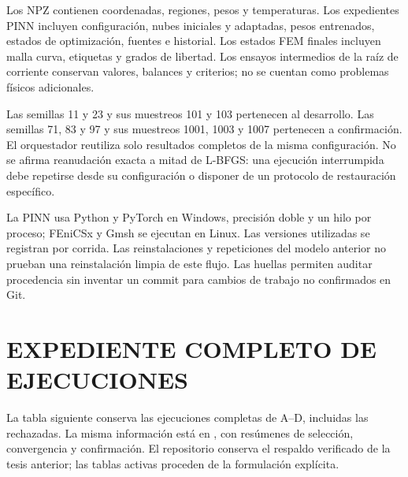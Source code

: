 Los NPZ contienen coordenadas, regiones, pesos y temperaturas. Los expedientes PINN incluyen configuración, nubes iniciales y adaptadas, pesos entrenados, estados de optimización, fuentes e historial. Los estados FEM finales incluyen malla curva, etiquetas y grados de libertad. Los ensayos intermedios de la raíz de corriente conservan valores, balances y criterios; no se cuentan como problemas físicos adicionales.

Las semillas 11 y 23 y sus muestreos 101 y 103 pertenecen al desarrollo. Las semillas 71, 83 y 97 y sus muestreos 1001, 1003 y 1007 pertenecen a confirmación. El orquestador reutiliza solo resultados completos de la misma configuración. No se afirma reanudación exacta a mitad de L-BFGS: una ejecución interrumpida debe repetirse desde su configuración o disponer de un protocolo de restauración específico.

La PINN usa Python y PyTorch en Windows, precisión doble y un hilo por proceso; FEniCSx y Gmsh se ejecutan en Linux. Las versiones utilizadas se registran por corrida. Las reinstalaciones y repeticiones del modelo anterior no prueban una reinstalación limpia de este flujo. Las huellas permiten auditar procedencia sin inventar un commit para cambios de trabajo no confirmados en Git.

\section{EXPEDIENTE COMPLETO DE EJECUCIONES}
\label{anx:expediente-evidencia}

La tabla siguiente conserva las ejecuciones completas de A--D, incluidas las rechazadas. La misma información está en , con resúmenes de selección, convergencia y confirmación. El repositorio conserva el respaldo verificado de la tesis anterior; las tablas activas proceden de la formulación explícita.


